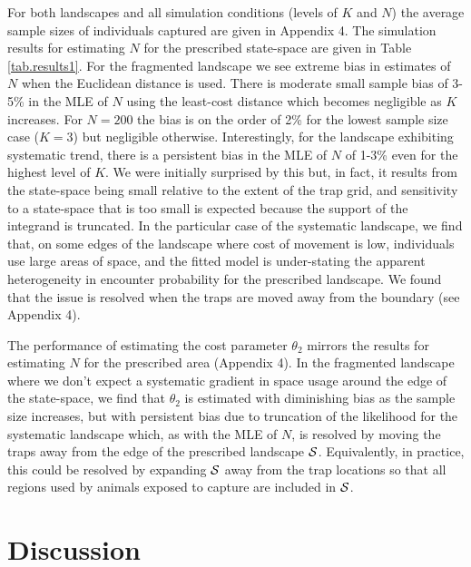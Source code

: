 \documentclass[12pt]{article}
\begin{document}
\begin{spacing}{1.8}
For both landscapes and all simulation conditions (levels of $K$ and
$N$) the average sample sizes of individuals captured are given in
Appendix 4.  The simulation results for estimating $N$
for the prescribed state-space are given in Table \ref{tab.results1}.
For the fragmented %
landscape we see extreme
bias in estimates of $N$ when the Euclidean distance is used. There is
moderate small sample bias of 3-5\% in the MLE of $N$ using the
least-cost distance which becomes negligible as $K$ increases. For
$N=200$ the bias is on the order of 2\% for the lowest sample size
case ($K=3$) but negligible otherwise.  Interestingly, for the
landscape exhibiting systematic trend, there is a persistent bias
in the MLE of $N$ of 1-3\% even for the highest level of $K$. We were
initially surprised by this but, in fact, it results from
the state-space being small relative to the extent of the trap grid, and
sensitivity to a state-space that is too small is expected because the
support of the integrand is truncated. In the particular case of the
systematic landscape, we find that, on some edges of the landscape
where cost of movement is low, individuals use large areas of space,
and the fitted model is under-stating the apparent
heterogeneity in encounter probability for the prescribed landscape.  We
found that the issue is resolved when the traps are moved away from
the boundary (see Appendix 4).

The performance of estimating the cost parameter $\theta_{2}$ mirrors
the results for estimating $N$ for the prescribed area
(Appendix 4). In the fragmented %
landscape where we don't expect a systematic gradient in space
usage around the edge of the state-space, we find
that $\theta_{2}$ is estimated with
diminishing bias as the sample size increases, but with persistent
bias due to truncation of the likelihood for the systematic
landscape which, as with the MLE of $N$, is resolved by moving the
traps away from the edge of the prescribed landscape ${\cal S}$. Equivalently, in practice,
this could be resolved by expanding ${\cal S}$ away from the trap
locations so that all regions used by animals exposed to capture are
included in ${\cal S}$.



\section{Discussion}


\end{spacing}
\end{document}
